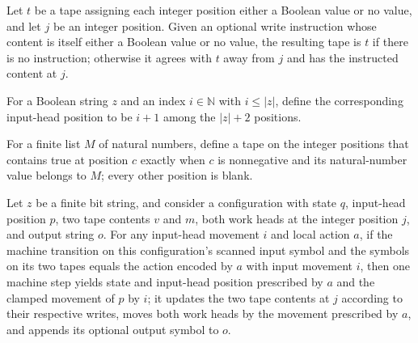 \begin{definition}
\label{BoolCircuit.CircuitEval.Internal.wr}
\leanok
Let $t$ be a tape assigning each integer position either a Boolean value or no value,
and let $j$ be an integer position. Given an optional write instruction whose content is
itself either a Boolean value or no value, the resulting tape is $t$ if there is no
instruction; otherwise it agrees with $t$ away from $j$ and has the instructed content
at $j$.
\end{definition}

\begin{definition}
\label{BoolCircuit.CircuitEval.Internal.ip}
\leanok
For a Boolean string $z$ and an index $i\in\mathbb{N}$ with $i\le |z|$, define the
corresponding input-head position to be $i+1$ among the $|z|+2$ positions.
\end{definition}

\begin{definition}
\label{BoolCircuit.CircuitEval.Internal.tapeM}
\leanok
For a finite list $M$ of natural numbers, define a tape on the integer positions that
contains true at position $c$ exactly when $c$ is nonnegative and its natural-number
value belongs to $M$; every other position is blank.
\end{definition}

\begin{theorem}
\label{BoolCircuit.CircuitEval.step_cf}
\leanok
{}
Let $z$ be a finite bit string, and consider a configuration with state $q$, input-head
position $p$, two tape contents $v$ and $m$, both work heads at the integer position
$j$, and output string $o$. For any input-head movement $i$ and local action $a$, if the
machine transition on this configuration's scanned input symbol and the symbols on its
two tapes equals the action encoded by $a$ with input movement $i$, then one machine
step yields state and input-head position prescribed by $a$ and the clamped movement of
$p$ by $i$; it updates the two tape contents at $j$ according to their respective
writes, moves both work heads by the movement prescribed by $a$, and appends its
optional output symbol to $o$.
\end{theorem}

